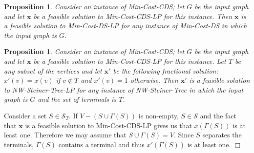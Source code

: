 \documentclass[11pt]{article}
\newtheorem{prop}[lemma]{Proposition}
\renewenvironment{proof}{\vspace{-0.1in}\noindent{\bf Proof:}}{\hspace*{\fill}$\Box$\par}
\def\script#1{\mathcal{#1}}
\def\sS{\script{S}}
\def\prob#1{\textsf{\textup{#1}}\xspace}
\def\minDSlp{\prob{\minDS-LP}}
\def\minCDSlp{\prob{\minCDS-LP}}
\def\nwST{\prob{NW-Steiner-Tree}}
\def\nwSTlp{\prob{\nwST-LP}}
\def\minCDS{\prob{Min-Cost-CDS}}
\def\minDS{\prob{Min-Cost-DS}}
\def\vx{\mathrm{\mathbf{x}}}
\begin{document}
\begin{prop} \label{prop:feasible-dominating-set}
	Consider an instance of \minCDS; let $G$ be the input graph and
	let $\vx$ be a feasible solution to \minCDSlp for this instance.
	Then $\vx$ is a feasible solution to \minDSlp for any instance of
	\minDS in which the input graph is $G$.
\end{prop}

\begin{prop} \label{prop:feasible-steiner-tree}
	Consider an instance of \minCDS; let $G$ be the input graph and
	let $\vx$ be a feasible solution to \minCDSlp for this instance.
	Let $T$ be any subset of the vertices and let $\vx'$ be the
	following fractional solution: $x'(v) = x(v)$ if $v \notin T$ and
	$x'(v) = 1$ otherwise. Then $\vx'$ is a feasible solution to
	\nwSTlp for any instance of \nwST in which the input graph is $G$
	and the set of terminals is $T$.
\end{prop}
\begin{proof}
	Consider a set $S \in \sS_T$. If $V - (S \cup \Gamma(S))$ is
	non-empty, $S \in \sS$ and the fact that $\vx$ is a feasible
	solution to \minCDSlp gives us that $x(\Gamma(S))$ is at least
	one. Therefore we may assume that $S \cup \Gamma(S) = V$. Since
	$S$ separates the terminals, $\Gamma(S)$ contains a terminal and
	thus $x'(\Gamma(S))$ is at least one.
\end{proof}
\end{document}
